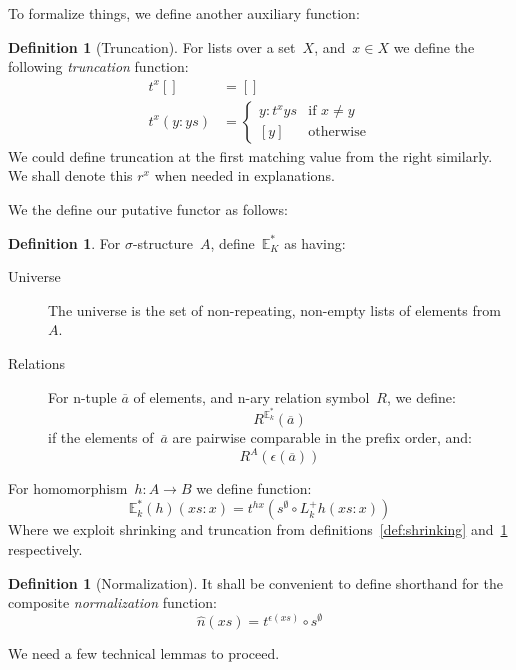\documentclass{article}
\theoremstyle{plain}
\theoremstyle{definition}
\newtheorem{definition}[theorem]{Definition}
\theoremstyle{remark}
\numberwithin{theorem}{section}
\begin{document}
To formalize things, we define another auxiliary function:
\begin{definition}[Truncation]
\label{def:truncation}
For lists over a set~$X$, and~$x \in X$ we define the following \emph{truncation} function:
\begin{align*}
    t^x [] &= []\\
    t^x (y:ys) &=
    \begin{cases}
    y : t^x ys &\mbox{if } x \neq y\\
    [y] &\mbox{otherwise}
    \end{cases}
\end{align*}
We could define truncation at the first matching value from the right similarly. We shall denote this $r^x$ when needed in explanations.
\end{definition}
We the define our putative functor as follows:
\begin{definition}
For $\sigma$-structure~$A$, define~$\mathbb{E}^*_K$ as having:
\begin{description}
\item[Universe] The universe is the set of non-repeating, non-empty lists of elements from~$A$.
\item[Relations] For n-tuple $\overline{a}$ of elements, and n-ary relation symbol~$R$, we define:
\begin{equation*}
    R^{\mathbb{E}^*_k}(\overline{a})
\end{equation*}
if the elements of~$\overline{a}$ are pairwise comparable in the prefix order, and:
\begin{equation*}
    R^A(\epsilon(\overline{a}))
\end{equation*}
\end{description}
For homomorphism~$h : A \rightarrow B$ we define function:
\begin{equation*}
    \mathbb{E}^*_k(h)(xs:x) = t^{h x}(s^\emptyset \circ L^+_k h (xs:x))
\end{equation*}
Where we exploit shrinking and truncation from definitions~\ref{def:shrinking} and~\ref{def:truncation} respectively.
\end{definition}
\begin{definition}[Normalization]
It shall be convenient to define shorthand for the composite \emph{normalization} function:
\begin{equation*}
    \hat{n}(xs) = t^{\epsilon(xs)} \circ s^\emptyset
\end{equation*}
\end{definition}
We need a few technical lemmas to proceed.
\end{document}
